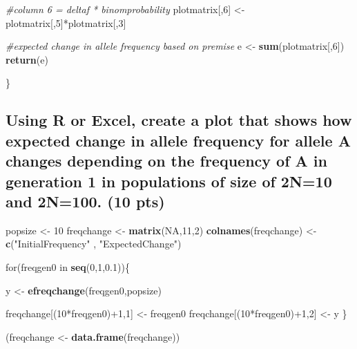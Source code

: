 \documentclass[]{article}
\newenvironment{Shaded}{\begin{snugshade}}{\end{snugshade}}
\newcommand{\KeywordTok}[1]{\textcolor[rgb]{0.13,0.29,0.53}{\textbf{{#1}}}}
\newcommand{\DecValTok}[1]{\textcolor[rgb]{0.00,0.00,0.81}{{#1}}}
\newcommand{\FloatTok}[1]{\textcolor[rgb]{0.00,0.00,0.81}{{#1}}}
\newcommand{\StringTok}[1]{\textcolor[rgb]{0.31,0.60,0.02}{{#1}}}
\newcommand{\CommentTok}[1]{\textcolor[rgb]{0.56,0.35,0.01}{\textit{{#1}}}}
\newcommand{\OtherTok}[1]{\textcolor[rgb]{0.56,0.35,0.01}{{#1}}}
\newcommand{\NormalTok}[1]{{#1}}
\begin{document}
\begin{Shaded}
\begin{Highlighting}[]
  \CommentTok{#column 6 = deltaf * binomprobability}
  \NormalTok{plotmatrix[,}\DecValTok{6}\NormalTok{] <-}\StringTok{ }\NormalTok{plotmatrix[,}\DecValTok{5}\NormalTok{]*plotmatrix[,}\DecValTok{3}\NormalTok{]}
  
  \CommentTok{#expected change in allele frequency based on premise}
  \NormalTok{e <-}\StringTok{ }\KeywordTok{sum}\NormalTok{(plotmatrix[,}\DecValTok{6}\NormalTok{])}
  \KeywordTok{return}\NormalTok{(e)}
  
\NormalTok{\}}
\end{Highlighting}
\end{Shaded}

\subsection{Using R or Excel, create a plot that shows how expected
change in allele frequency for allele A changes depending on the
frequency of A in generation 1 in populations of size of 2N=10 and
2N=100. (10
pts)}\label{using-r-or-excel-create-a-plot-that-shows-how-expected-change-in-allele-frequency-for-allele-a-changes-depending-on-the-frequency-of-a-in-generation-1-in-populations-of-size-of-2n10-and-2n100.-10-pts}

\begin{Shaded}
\begin{Highlighting}[]
\NormalTok{popsize <-}\StringTok{ }\DecValTok{10}
\NormalTok{freqchange <-}\StringTok{ }\KeywordTok{matrix}\NormalTok{(}\OtherTok{NA}\NormalTok{,}\DecValTok{11}\NormalTok{,}\DecValTok{2}\NormalTok{)}
\KeywordTok{colnames}\NormalTok{(freqchange) <-}\StringTok{ }\KeywordTok{c}\NormalTok{(}\StringTok{"InitialFrequency"} \NormalTok{, }\StringTok{"ExpectedChange"}\NormalTok{)}

\NormalTok{for(freqgen0 in }\KeywordTok{seq}\NormalTok{(}\DecValTok{0}\NormalTok{,}\DecValTok{1}\NormalTok{,}\FloatTok{0.1}\NormalTok{))\{}
  
  \NormalTok{y <-}\StringTok{ }\KeywordTok{efreqchange}\NormalTok{(freqgen0,popsize)}
  
  \NormalTok{freqchange[(}\DecValTok{10}\NormalTok{*freqgen0)+}\DecValTok{1}\NormalTok{,}\DecValTok{1}\NormalTok{] <-}\StringTok{ }\NormalTok{freqgen0}
  \NormalTok{freqchange[(}\DecValTok{10}\NormalTok{*freqgen0)+}\DecValTok{1}\NormalTok{,}\DecValTok{2}\NormalTok{] <-}\StringTok{ }\NormalTok{y}
\NormalTok{\}}

\NormalTok{(freqchange <-}\StringTok{ }\KeywordTok{data.frame}\NormalTok{(freqchange))}
\end{Highlighting}
\end{Shaded}
\end{document}
